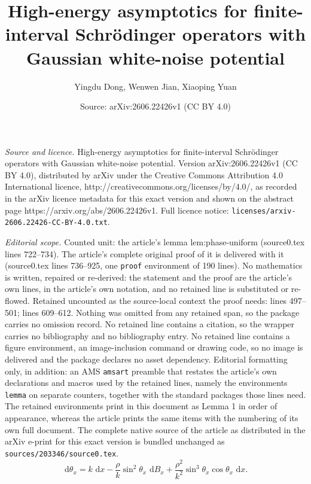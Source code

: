 \documentclass[10pt,a4paper]{amsart}
\title{High-energy asymptotics for finite-interval Schr\"odinger operators with Gaussian white-noise potential}
\author{Yingdu Dong, Wenwen Jian, Xiaoping Yuan}
\date{Source: arXiv:2606.22426v1 (CC BY 4.0)}
\newcommand{\dd}{\,\mathrm d}
\begin{document}
\maketitle

\noindent\emph{Source and licence.} High-energy asymptotics for finite-interval Schr\"odinger operators with Gaussian white-noise potential. Version arXiv:2606.22426v1 (CC BY 4.0), distributed by arXiv under the Creative Commons Attribution 4.0 International licence, http://creativecommons.org/licenses/by/4.0/, as recorded in the arXiv licence metadata for this exact version and shown on the abstract page https://arxiv.org/abs/2606.22426v1. Full licence notice: \texttt{licenses/arxiv-2606.22426-CC-BY-4.0.txt}.\par\smallskip

\noindent\textit{Editorial scope.} Counted unit: the article's lemma lem:phase-uniform (source0.tex lines 722--734). The article's complete original proof of it is delivered with it (source0.tex lines 736--925, one \texttt{proof} environment of 190 lines). No mathematics is written, repaired or re-derived: the statement and the proof are the article's own lines, in the article's own notation, and no retained line is substituted or re-flowed.  Retained uncounted as the source-local context the proof needs: lines 497--501; lines 609--612.  Nothing was omitted from any retained span, so the package carries no omission record.  No retained line contains a citation, so the wrapper carries no bibliography and no bibliography entry.  No retained line contains a figure environment, an image-inclusion command or drawing code, so no image is delivered and the package declares no asset dependency.  Editorial formatting only, in addition: an AMS \texttt{amsart} preamble that restates the article's own declarations and macros used by the retained lines, namely the environments \texttt{lemma} on separate counters, together with the standard packages those lines need.  The retained environments print in this document as Lemma 1 in order of appearance, whereas the article prints the same items with the numbering of its own full document.  The complete native source of the article as distributed in the arXiv e-print for this exact version is bundled unchanged as \texttt{sources/203346/source0.tex}.
\begin{equation}\label{eq:prufer-angle}
    \dd\theta_x
    =k\,\dd x-\frac{\rho}{k}\sin^2\theta_x\,\dd B_x
    +\frac{\rho^2}{k^2}\sin^3\theta_x\cos\theta_x\,\dd x.
\end{equation}
\end{document}
